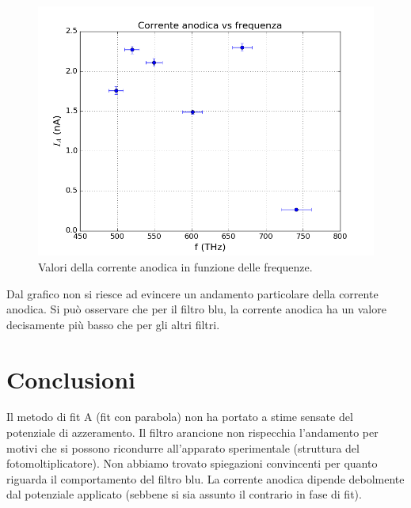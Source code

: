 \documentclass[10pt,a4paper]{article}
\begin{document}
\begin{figure}[!htb]
\centering
\includegraphics[scale=0.7]{correnteanodica.png}
\caption{Valori della corrente anodica in funzione delle frequenze.\label{fig:correnteanodica}}
\end{figure}
Dal grafico non si riesce ad evincere un andamento particolare della corrente anodica.
Si può osservare che per il filtro blu, la corrente anodica ha un valore decisamente più basso che per gli altri filtri. 

\section{Conclusioni}
Il metodo di fit A (fit con parabola) non ha portato a stime sensate del potenziale di azzeramento.
Il filtro arancione non rispecchia l'andamento per motivi che si possono ricondurre all'apparato sperimentale (struttura del fotomoltiplicatore).
Non abbiamo trovato spiegazioni convincenti per quanto riguarda il comportamento del filtro blu.
La corrente anodica dipende debolmente dal potenziale applicato (sebbene si sia assunto il contrario in fase di fit).
\end{document}
